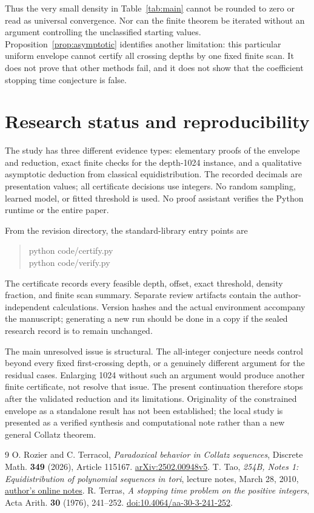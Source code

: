 \documentclass[11pt,a4paper]{amsart}
\theoremstyle{definition}
\theoremstyle{remark}
\begin{document}
Thus the very small density in Table~\ref{tab:main} cannot be rounded to
zero or read as universal convergence. Nor can the finite theorem be
iterated without an argument controlling the unclassified starting
values. Proposition~\ref{prop:asymptotic} identifies another limitation:
this particular uniform envelope cannot certify all crossing depths by
one fixed finite scan. It does not prove that other methods fail, and it
does not show that the coefficient stopping time conjecture is false.

\section{Research status and reproducibility}
The study has three different evidence types: elementary proofs of the
envelope and reduction, exact finite checks for the depth-1024 instance,
and a qualitative asymptotic deduction from classical equidistribution.
The recorded decimals are presentation values; all certificate decisions
use integers. No random sampling, learned model, or fitted threshold is
used. No proof assistant verifies the Python runtime or the entire paper.

From the revision directory, the standard-library entry points are
\begin{quote}\small\ttfamily
python code/certify.py\\
python code/verify.py
\end{quote}
The certificate records every feasible depth, offset, exact threshold,
density fraction, and finite scan summary. Separate review artifacts
contain the author-independent calculations. Version hashes and the
actual environment accompany the manuscript; generating a new run should
be done in a copy if the sealed research record is to remain unchanged.

The main unresolved issue is structural. The all-integer conjecture needs
control beyond every fixed first-crossing depth, or a genuinely different
argument for the residual cases. Enlarging 1024 without such an argument
would produce another finite certificate, not resolve that issue.
The present continuation therefore stops after the validated reduction
and its limitations. Originality of the constrained envelope as a
standalone result has not been established; the local study is presented
as a verified synthesis and computational note rather than a new general
Collatz theorem.

\begin{thebibliography}{9}
 O. Rozier and C. Terracol, \emph{Paradoxical behavior in
Collatz sequences}, Discrete Math. \textbf{349} (2026), Article 115167.
\href{https://arxiv.org/abs/2502.00948v5}{arXiv:2502.00948v5}.
 T. Tao, \emph{254B, Notes 1: Equidistribution of
polynomial sequences in tori}, lecture notes, March 28, 2010,
\href{https://terrytao.wordpress.com/2010/03/28/254b-notes-1-equidistribution-of-polynomial-sequences-in-torii/}{author's online notes}.
 R. Terras, \emph{A stopping time problem on the positive
integers}, Acta Arith. \textbf{30} (1976), 241--252.
\href{https://doi.org/10.4064/aa-30-3-241-252}{doi:10.4064/aa-30-3-241-252}.
\end{thebibliography}
\end{document}
